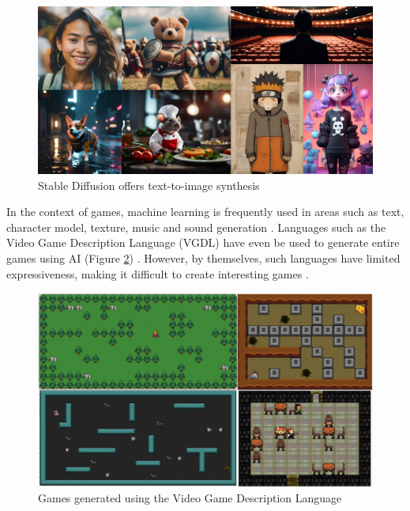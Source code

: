 \begin{figure}[H]
    \centering
    \includegraphics[width=\textwidth, height=0.3\textheight, keepaspectratio]{Images/StableDiffusion.jpg}
    \caption{Stable Diffusion offers text-to-image synthesis \cite{Stable_Diffusion}}
    \label{fig:stableDiffusion}
\end{figure}

In the context of games, machine learning is frequently used in areas such as text, character model, texture, music and sound generation \cite{DeepLearningPCG}. Languages such as the Video Game Description Language (VGDL) have even be used to generate entire games using AI (Figure \ref{fig:vgdl}) \cite{VGDL, VGDL_ASP}. However, by themselves, such languages have limited expressiveness, making it difficult to create interesting games \cite{VGDL}.

\begin{figure}[H]
    \centering
    \includegraphics[width=\textwidth, height=0.3\textheight, keepaspectratio]{Images/VGDL.jpg}
    \caption{Games generated using the Video Game Description Language \cite{VGDL}}
    \label{fig:vgdl}
\end{figure}

